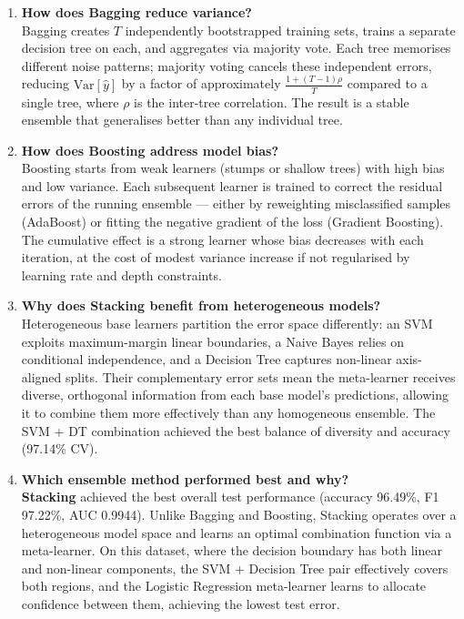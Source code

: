 \documentclass[12pt,a4paper]{article}
\begin{document}
\begin{enumerate}

\item \textbf{How does Bagging reduce variance?}\\
  Bagging creates $T$ independently bootstrapped training sets, trains a separate decision tree
  on each, and aggregates via majority vote. Each tree memorises different noise patterns; majority
  voting cancels these independent errors, reducing $\text{Var}[\hat{y}]$ by a factor of
  approximately $\frac{1+(T-1)\rho}{T}$ compared to a single tree, where $\rho$ is the
  inter-tree correlation. The result is a stable ensemble that generalises better than any
  individual tree.

\item \textbf{How does Boosting address model bias?}\\
  Boosting starts from weak learners (stumps or shallow trees) with high bias and low variance.
  Each subsequent learner is trained to correct the residual errors of the running ensemble ---
  either by reweighting misclassified samples (AdaBoost) or fitting the negative gradient of the
  loss (Gradient Boosting). The cumulative effect is a strong learner whose bias decreases
  with each iteration, at the cost of modest variance increase if not regularised by learning
  rate and depth constraints.

\item \textbf{Why does Stacking benefit from heterogeneous models?}\\
  Heterogeneous base learners partition the error space differently: an SVM exploits
  maximum-margin linear boundaries, a Naive Bayes relies on conditional independence, and a
  Decision Tree captures non-linear axis-aligned splits. Their complementary error sets mean the
  meta-learner receives diverse, orthogonal information from each base model's predictions, allowing
  it to combine them more effectively than any homogeneous ensemble. The SVM + DT combination
  achieved the best balance of diversity and accuracy (97.14\% CV).

\item \textbf{Which ensemble method performed best and why?}\\
  \textbf{Stacking} achieved the best overall test performance (accuracy 96.49\%, F1 97.22\%,
  AUC 0.9944). Unlike Bagging and Boosting, Stacking operates over a heterogeneous model space
  and learns an optimal combination function via a meta-learner. On this dataset, where the
  decision boundary has both linear and non-linear components, the SVM + Decision Tree pair
  effectively covers both regions, and the Logistic Regression meta-learner learns to allocate
  confidence between them, achieving the lowest test error.

\end{enumerate}
\end{document}
